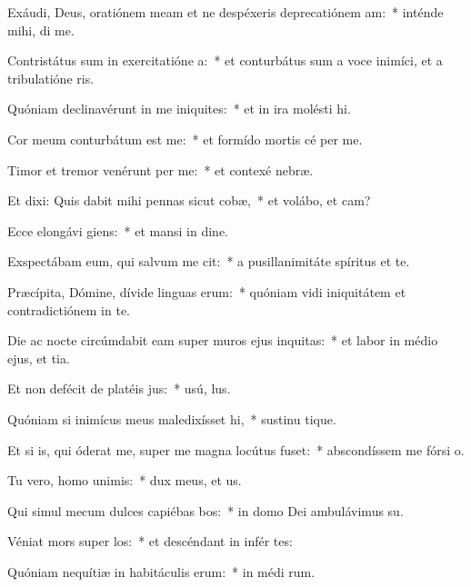 \item Exáudi, Deus, oratiónem meam et ne despéxeris deprecatiónem am:~* inténde mihi,  di me.
\item Contristátus sum in exercitatióne a:~* et conturbátus sum a voce inimíci, et a tribulatióne ris.
\item Quóniam declinavérunt in me iniquites:~* et in ira molésti  hi.
\item Cor meum conturbátum est  me:~* et formído mortis cé per me.
\item Timor et tremor venérunt per me:~* et contexé  nebræ.
\item Et dixi: Quis dabit mihi pennas sicut cobæ,~* et volábo, et cam?
\item Ecce elongávi giens:~* et mansi in dine.
\item Exspectábam eum, qui salvum me cit:~* a pusillanimitáte spíritus et te.
\item Præcípita, Dómine, dívide linguas erum:~* quóniam vidi iniquitátem et contradictiónem in te.
\item Die ac nocte circúmdabit eam super muros ejus inquitas:~* et labor in médio ejus, et tia.
\item Et non defécit de platéis jus:~* usú,  lus.
\item Quóniam si inimícus meus maledixísset hi,~* sustinu tique.
\item Et si is, qui óderat me, super me magna locútus fuset:~* abscondíssem me fórsi  o.
\item Tu vero, homo unimis:~* dux meus, et  us.
\item Qui simul mecum dulces capiébas bos:~* in domo Dei ambulávimus  su.
\item Véniat mors super los:~* et descéndant in infér tes:
\item Quóniam nequítiæ in habitáculis erum:~* in médi rum.
